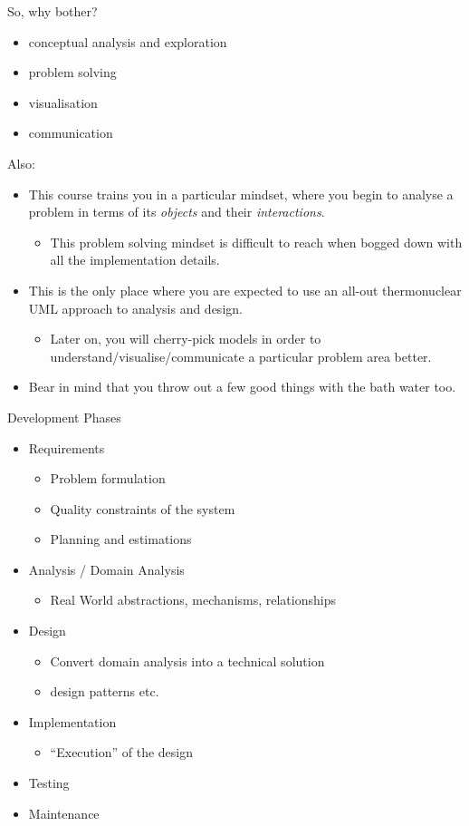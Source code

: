 \documentclass[10pt,t,a4paper]{beamer}
\begin{document}
\begin{frame}[label=sec-10]{So, why bother?}
\begin{itemize}
\item conceptual analysis and exploration
\item problem solving
\item visualisation
\item communication
\end{itemize}

Also:
\begin{itemize}
\item This course trains you in a particular mindset, where you begin to analyse a problem in terms of its \emph{objects} and their \emph{interactions}.
\begin{itemize}
\item This problem solving mindset is difficult to reach when bogged down with all the implementation details.
\end{itemize}
\item This is the only place where you are expected to use an all-out thermonuclear UML approach to analysis and design.
\begin{itemize}
\item Later on, you will cherry-pick models in order to understand/visualise/communicate a particular problem area better.
\end{itemize}
\item Bear in mind that you throw out a few good things with the bath water too.
\end{itemize}
\end{frame}
\begin{frame}[label=sec-11]{Development Phases}
\begin{itemize}
\item Requirements
\begin{itemize}
\item Problem formulation
\item Quality constraints of the system
\item Planning and estimations
\end{itemize}
\item Analysis / Domain Analysis
\begin{itemize}
\item Real World abstractions, mechanisms, relationships
\end{itemize}
\item Design
\begin{itemize}
\item Convert domain analysis into a technical solution
\item design patterns etc.
\end{itemize}
\item Implementation
\begin{itemize}
\item ``Execution'' of the design
\end{itemize}
\item Testing
\item Maintenance
\end{itemize}
\end{frame}
\end{document}
